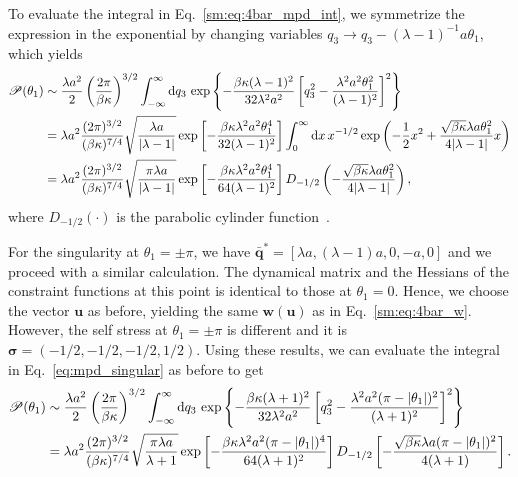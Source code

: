 To evaluate the integral in Eq.~\eqref{sm:eq:4bar_mpd_int}, we symmetrize the expression in the exponential by changing variables $q_3 \to q_3 - (\lambda-1)^{-1}a\theta_1$, which yields
%
\begin{equation}
  \begin{aligned}
    \mathscr{P}(\theta_1) &\sim \frac{\lambda a^2}{2}\left(\frac{2\pi}{\beta\kappa}\right)^{3/2}\int_{-\infty}^{\infty} \mathrm{d} q_3\, \exp\left\{-\frac{\beta\kappa(\lambda-1)^2}{32\lambda^2 a^2}\left[q_3^2 - \frac{\lambda^2 a^2\theta_1^2}{(\lambda-1)^2}\right]^2\right\}\\
                                           &= \lambda a^2\frac{(2\pi)^{3/2}}{(\beta\kappa)^{7/4}}\sqrt{\frac{\lambda{a}}{\lvert\lambda-1\rvert}}\exp\left[-\frac{\beta\kappa\lambda^2a^2\theta_1^4}{32(\lambda-1)^2}\right]\int_{0}^{\infty} \mathrm{d} x\, x^{-1/2}\exp\left(-\frac{1}{2}x^2 + \frac{\sqrt{\beta\kappa}\lambda a\theta_1^2}{4\lvert\lambda-1\rvert}x\right)\\
                                           &= \lambda a^2\frac{(2\pi)^{3/2}}{(\beta\kappa)^{7/4}}\sqrt{\frac{\pi\lambda{a}}{\lvert\lambda-1\rvert}}\exp\left[-\frac{\beta\kappa\lambda^2a^2\theta_1^4}{64(\lambda-1)^2}\right]D_{-1/2}\left(-\frac{\sqrt{\beta\kappa}\lambda a\theta_1^2}{4\lvert\lambda-1\rvert}\right),
  \end{aligned}
  \label{sm:eq:4bar_0}
\end{equation}
%
where $D_{-1/2}(\cdot)$ is the parabolic cylinder function~\cite{olver2010}.

For the singularity at $\theta_{1} = \pm\pi$, we have $\bar{\bm{q}}^{*} = [\lambda a, (\lambda-1)a, 0, -a, 0]$ and we proceed with a similar calculation.
The dynamical matrix and the Hessians of the constraint functions at this point is identical to those at $\theta_{1} = 0$.
Hence, we choose the vector $\bm{u}$ as before, yielding the same $\bm{w}(\bm{u})$ as in Eq.~\eqref{sm:eq:4bar_w}.
However, the self stress at $\theta_1 = \pm\pi$ is different and it is $\bm{\sigma} = \left(-1/2, -1/2, -1/2, 1/2\right)$.
Using these results, we can evaluate the integral in Eq.~\eqref{eq:mpd_singular} as before to get
%
\begin{equation}
  \begin{aligned}
    \mathscr{P}(\theta_1) &\sim \frac{\lambda a^2}{2}\left(\frac{2\pi}{\beta\kappa}\right)^{3/2}\int_{-\infty}^{\infty} \mathrm{d}{q}_3\, \exp\left\{-\frac{\beta\kappa(\lambda+1)^2}{32\lambda^2 a^2}\left[q_3^2 - \frac{\lambda^2 a^2(\pi-\lvert\theta_1\rvert)^2}{(\lambda+1)^2}\right]^2\right\}\\
                                           &= \lambda a^2\frac{(2\pi)^{3/2}}{(\beta\kappa)^{7/4}}\sqrt{\frac{\pi\lambda{a}}{\lambda+1}}\exp\left[-\frac{\beta\kappa\lambda^2a^2(\pi-\lvert\theta_1\rvert)^4}{64(\lambda+1)^2}\right]D_{-1/2}\left[-\frac{\sqrt{\beta\kappa}\lambda a(\pi-\lvert\theta_1\rvert)^2}{4(\lambda+1)}\right].
  \end{aligned}
  \label{sm:eq:4bar_pi}
\end{equation}


